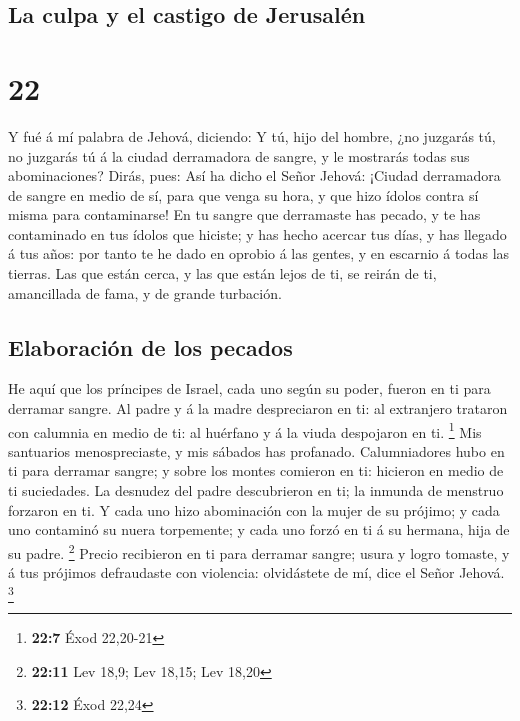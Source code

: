 \hypertarget{la-culpa-y-el-castigo-de-jerusaluxe9n}{%
\subsection{La culpa y el castigo de
Jerusalén}\label{la-culpa-y-el-castigo-de-jerusaluxe9n}}

\hypertarget{section-21}{%
\section{22}\label{section-21}}

 Y fué á mí palabra de Jehová, diciendo:  Y
tú, hijo del hombre, ¿no juzgarás tú, no juzgarás tú á la ciudad
derramadora de sangre, y le mostrarás todas sus abominaciones?
 Dirás, pues: Así ha dicho el Señor Jehová: ¡Ciudad
derramadora de sangre en medio de sí, para que venga su hora, y que hizo
ídolos contra sí misma para contaminarse!  En tu sangre
que derramaste has pecado, y te has contaminado en tus ídolos que
hiciste; y has hecho acercar tus días, y has llegado á tus años: por
tanto te he dado en oprobio á las gentes, y en escarnio á todas las
tierras.  Las que están cerca, y las que están lejos de
ti, se reirán de ti, amancillada de fama, y de grande turbación.

\hypertarget{elaboraciuxf3n-de-los-pecados}{%
\subsection{Elaboración de los
pecados}\label{elaboraciuxf3n-de-los-pecados}}

 He aquí que los príncipes de Israel, cada uno según su
poder, fueron en ti para derramar sangre.  Al padre y á la
madre despreciaron en ti: al extranjero trataron con calumnia en medio
de ti: al huérfano y á la viuda despojaron en ti. \footnote{\textbf{22:7}
  Éxod 22,20-21}  Mis santuarios menospreciaste, y mis
sábados has profanado.  Calumniadores hubo en ti para
derramar sangre; y sobre los montes comieron en ti: hicieron en medio de
ti suciedades.  La desnudez del padre descubrieron en ti;
la inmunda de menstruo forzaron en ti.  Y cada uno hizo
abominación con la mujer de su prójimo; y cada uno contaminó su nuera
torpemente; y cada uno forzó en ti á su hermana, hija de su padre.
\footnote{\textbf{22:11} Lev 18,9; Lev 18,15; Lev 18,20} 
Precio recibieron en ti para derramar sangre; usura y logro tomaste, y á
tus prójimos defraudaste con violencia: olvidástete de mí, dice el Señor
Jehová. \footnote{\textbf{22:12} Éxod 22,24}


